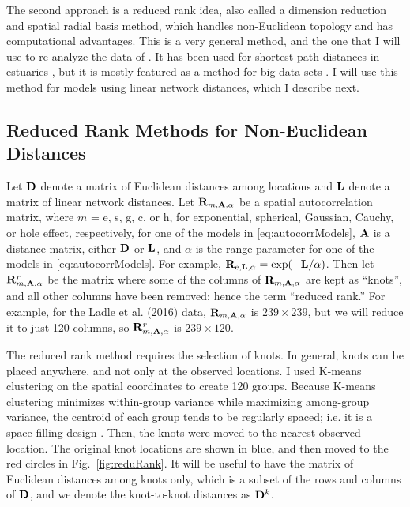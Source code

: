 \documentclass[11pt, titlepage]{article}\usepackage[]{graphicx}\usepackage[]{color}
\begin{document}
\begin{spacing}{1.9}
\begin{flushleft}
The second approach is a reduced rank idea, also called a dimension reduction \citep{Wikl:Cres:dime:1999} and spatial radial basis \citep{Lin:Chen:spat:2004, Hefl:Brom:Bros:Bude:basi:2016} method, which handles non-Euclidean topology and has computational advantages.  This is a very general method, and the one that I will use to re-analyze the data of \citet{Ladl:Avga:Whea:Boyc:pred:2016}.  It has been used for shortest path distances in estuaries \citep{Wang:Rana:low:2007}, but it is mostly featured as a method for big data sets \citep[e.g.][]{Wikl:Cres:dime:1999, Rupp:Wand:Carr:semi:2003, Cres:Gard:fixe:2008,Bane:Gelf:Finl:Sang:gaus:2008}.  I will use this method for models using linear network distances, which I describe next.


\subsection*{Reduced Rank Methods for Non-Euclidean Distances}

Let $\mathbf{D}$ denote a matrix of Euclidean distances among locations and $\mathbf{L}$ denote a matrix of linear network distances. Let $\mathbf{R}_{m,\mathbf{A},\alpha}$ be a spatial autocorrelation matrix, where $m$ = e, s, g, c, or h, for exponential, spherical, Gaussian, Cauchy, or hole effect, respectively, for one of the models in \ref{eq:autocorrModels}, $\mathbf{A}$ is a distance matrix, either $\mathbf{D}$ or $\mathbf{L}$, and $\alpha$ is the range parameter for one of the models in \ref{eq:autocorrModels}.  For example, $\mathbf{R}_{\textrm{e},\mathbf{L},\alpha} = \exp(-\mathbf{L}/\alpha)$.  Then let $\mathbf{R}^r_{m,\mathbf{A},\alpha}$ be the matrix where some of the columns of $\mathbf{R}_{m,\mathbf{A},\alpha}$ are kept as ``knots'', and all other columns have been removed; hence the term ``reduced rank.''  For example, for the Ladle et al. (2016) data, $\mathbf{R}_{m,\mathbf{A},\alpha}$ is $239 \times 239$, but we will reduce it to just 120 columns, so $\mathbf{R}^r_{m,\mathbf{A},\alpha}$ is $239 \times 120$.  

The reduced rank method requires the selection of knots.  In general, knots can be placed anywhere, and not only at the observed locations.  I used K-means clustering \citep{MacQ:some:1967} on the spatial coordinates to create 120 groups. Because K-means clustering minimizes within-group variance while maximizing among-group variance, the centroid of each group tends to be regularly spaced; i.e. it is a space-filling design \citep[e.g.][]{Ver:Jans:esti:2015}.  Then, the knots were moved to the nearest observed location. The original knot locations are shown in blue, and then moved to the red circles in Fig.~\ref{fig:reduRank}.  It will be useful to have the matrix of Euclidean distances among knots only, which is a subset of the rows and columns of $\mathbf{D}$, and we denote the knot-to-knot distances as $\mathbf{D}^k$. 


\end{flushleft}
\end{spacing}
\end{document}
